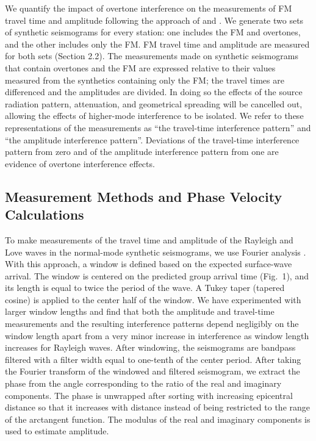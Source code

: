 \documentclass[extra,mreferee]{gji}
\begin{document}
We quantify the impact of overtone interference on the measurements of FM travel time and amplitude following the approach of \citet{hariharan2020evidence} and \citet{foster2014overtone}. We generate two sets of synthetic seismograms for every station: one includes the FM and overtones, and the other includes only the FM. FM travel time and amplitude are measured for both sets (Section 2.2). The measurements made on synthetic seismograms that contain overtones and the FM are  expressed relative to their values measured from the synthetics containing only
the FM; the travel times are differenced and the amplitudes are divided. In doing so the effects of the source radiation pattern, attenuation, and geometrical
spreading will be cancelled out, allowing the effects of higher-mode interference to be isolated. We refer to these representations of the measurements as ``the travel-time interference pattern'' and ``the amplitude interference pattern''. Deviations of the travel-time interference pattern from zero and of the amplitude interference pattern from one are evidence of overtone interference effects.

\subsection{Measurement Methods and Phase Velocity Calculations}

To make measurements of the travel time and amplitude of the Rayleigh and Love waves in the normal-mode synthetic seismograms, we use Fourier analysis \citep{forsyth2005array}. With this approach, a window is defined based on the expected surface-wave arrival. The window is centered on the predicted group arrival time (Fig.\ 1), and its length is equal to twice the period of the wave. A Tukey taper (tapered cosine) is applied to the center half of the window. We have experimented with larger window lengths and find that both the amplitude and travel-time measurements and the resulting interference patterns depend negligibly on the window length apart from a very minor increase in interference as window length increases for Rayleigh waves. After windowing, the seismograms are bandpass filtered with a filter width equal to one-tenth of the center period. After taking the Fourier transform of the windowed and filtered seismogram, we extract the phase from the angle corresponding to the ratio of the real and imaginary components. The phase is unwrapped after sorting with increasing epicentral distance so that it increases with distance instead of being restricted to the range of the arctangent function. The modulus of the real and imaginary components is used to estimate amplitude. 
\end{document}
